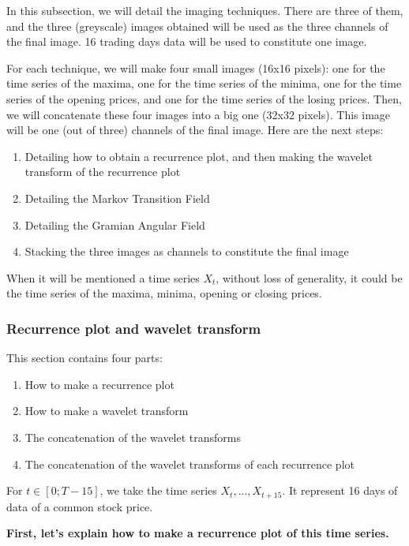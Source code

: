 \documentclass[11pt]{article}
\begin{document}
\begin{onehalfspace}
In this subsection, we will detail the imaging techniques. There are three of them, and the three (greyscale) images obtained will be used as the three channels of the final image. 16 trading days data will be used to constitute one image.

For each technique, we will make four small images (16x16 pixels): one for the time series of the maxima, one for the time series of the minima, one for the time series of the opening prices, and one for the time series of the losing prices. Then, we will concatenate these four images into a big one (32x32 pixels). This image will be one (out of three) channels of the final image. Here are the next steps:

\begin{enumerate}
    \item Detailing how to obtain a recurrence plot, and then making the wavelet transform of the recurrence plot
    \item Detailing the Markov Transition Field
    \item Detailing the Gramian Angular Field
    \item Stacking the three images as channels to constitute the final image
\end{enumerate}

When it will be mentioned a time series $X_t$, without loss of generality, it could be the time series of the maxima, minima, opening or closing prices. 

\subsubsection{Recurrence plot and wavelet transform}

This section contains four parts:

\begin{enumerate}
    \item How to make a recurrence plot
    \item How to make a wavelet transform
    \item The concatenation of the wavelet transforms
    \item The concatenation of the wavelet transforms of each recurrence plot 
\end{enumerate}

For $t \in [0; T-15]$, we take the time series $X_t, ..., X_{t+15}$. It represent 16 days of data of a common stock price.

\noindent \textbf{First, let's explain how to make a recurrence plot of this time series.}


\end{onehalfspace}
\end{document}

